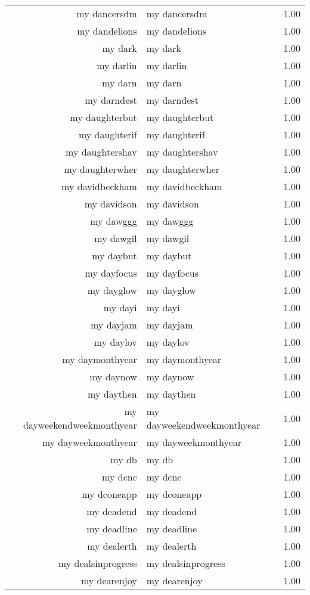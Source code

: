 \begin{table}[ht]
\begin{tabular}{rlr}
  my dancersdm & my dancersdm & 1.00 \\ 
  my dandelions & my dandelions & 1.00 \\ 
  my dark & my dark & 1.00 \\ 
  my darlin & my darlin & 1.00 \\ 
  my darn & my darn & 1.00 \\ 
  my darndest & my darndest & 1.00 \\ 
  my daughterbut & my daughterbut & 1.00 \\ 
  my daughterif & my daughterif & 1.00 \\ 
  my daughtershav & my daughtershav & 1.00 \\ 
  my daughterwher & my daughterwher & 1.00 \\ 
  my davidbeckham & my davidbeckham & 1.00 \\ 
  my davidson & my davidson & 1.00 \\ 
  my dawggg & my dawggg & 1.00 \\ 
  my dawgil & my dawgil & 1.00 \\ 
  my daybut & my daybut & 1.00 \\ 
  my dayfocus & my dayfocus & 1.00 \\ 
  my dayglow & my dayglow & 1.00 \\ 
  my dayi & my dayi & 1.00 \\ 
  my dayjam & my dayjam & 1.00 \\ 
  my daylov & my daylov & 1.00 \\ 
  my daymonthyear & my daymonthyear & 1.00 \\ 
  my daynow & my daynow & 1.00 \\ 
  my daythen & my daythen & 1.00 \\ 
  my dayweekendweekmonthyear & my dayweekendweekmonthyear & 1.00 \\ 
  my dayweekmonthyear & my dayweekmonthyear & 1.00 \\ 
  my db & my db & 1.00 \\ 
  my dcnc & my dcnc & 1.00 \\ 
  my dconeapp & my dconeapp & 1.00 \\ 
  my deadend & my deadend & 1.00 \\ 
  my deadline & my deadline & 1.00 \\ 
  my dealerth & my dealerth & 1.00 \\ 
  my dealsinprogress & my dealsinprogress & 1.00 \\ 
  my dearenjoy & my dearenjoy & 1.00 \\ 

\end{tabular}
\end{table}

